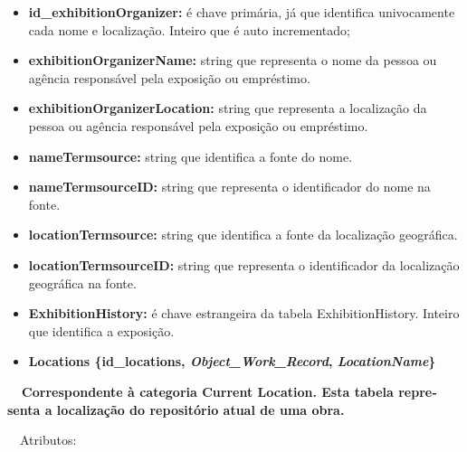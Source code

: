 \documentclass[letterpaper]{article}
\newcommand\textstyleStrongEmphasis[1]{\textbf{#1}}
\newcommand\liststyleLi{%
\renewcommand\labelitemi{{\textbullet}}
\renewcommand\labelitemii{[27A2?]}
\renewcommand\labelitemiii{{\textbullet}}
\renewcommand\labelitemiv{{\textbullet}}
}
\newcommand\liststyleLxiv{%
\renewcommand\labelitemi{[27A2?]}
\renewcommand\labelitemii{[27A2?]}
\renewcommand\labelitemiii{[27A2?]}
\renewcommand\labelitemiv{[27A2?]}
}
\begin{document}
\liststyleLxiv
\begin{itemize}
\item {
\textbf{id\_exhibitionOrganizer: }\'e chave prim\'aria, j\'a que
identifica univocamente cada nome e localiza\c{c}\~ao. Inteiro que \'e
auto incrementado;}
\item {
\textbf{exhibitionOrganizerName: }string que representa o nome da pessoa
ou ag\^encia respons\'avel pela exposi\c{c}\~ao ou empr\'estimo.}
\item {
\textbf{exhibitionOrganizerLocation: }string que representa a
localiza\c{c}\~ao da pessoa ou ag\^encia respons\'avel pela
exposi\c{c}\~ao ou empr\'estimo.}
\item {
\textbf{nameTermsource: }string que identifica a fonte do nome.}
\item {
\textbf{nameTermsourceID:} string que representa o identificador do nome
na fonte.}
\item {
\textbf{locationTermsource: }string que identifica a fonte da
localiza\c{c}\~ao geogr\'afica.}
\item {
\textbf{locationTermsourceID:} string que representa o identificador da
localiza\c{c}\~ao geogr\'afica na fonte.}
\item {
\textbf{ExhibitionHistory:}\textit{ }\'e chave estrangeira da tabela
ExhibitionHistory. Inteiro que identifica a exposi\c{c}\~ao.}
\end{itemize}

\bigskip

\liststyleLi
\begin{itemize}
\item {\bfseries
Locations\textmd{ \{}\textmd{id\_locations}\textmd{,
}\textmd{\textit{Object\_Work\_Record}}\textmd{,
}\textmd{\textit{LocationName}}\textmd{\}}}
\end{itemize}
{\bfseries
\foreignlanguage{english}{\textmd{\ \ Correspondente \`a categoria
}}\textstyleStrongEmphasis{\foreignlanguage{english}{Current
Location}}\foreignlanguage{english}{\textmd{. Esta
}}\textstyleStrongEmphasis{\foreignlanguage{english}{\textmd{tabela}}}\foreignlanguage{english}{\textmd{
representa a localiza\c{c}\~ao do reposit\'orio atual de uma obra.}}}


\bigskip

{
\ \ Atributos:}
\end{document}
